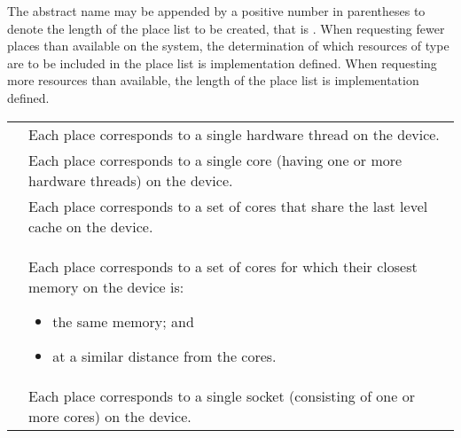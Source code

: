 The abstract name may be appended by a positive number in parentheses
to denote the length of the place list to be created, that is
. When requesting fewer places than
available on the system, the determination of which resources of type
 are to be included in the place list is implementation
defined. When requesting more resources than available, the length of the
place list is implementation defined.

\medskip
\nolinenumbers
\renewcommand{\arraystretch}{1.5}
\tablelasttail{\hline}
\begin{supertabular}{p{1.5in} p{3.5in}}
{} & Each place corresponds to a single hardware
                    thread on the device.\\
{}   & Each place corresponds to a single core (having
                    one or more hardware threads) on the device.\\
{} & Each place corresponds to a set of cores that 
                    share the last level cache on the device.\\
{} & Each place corresponds to a set of cores for
                    which their closest memory on the device is:
		    \begin{itemize}
			    \item the same memory; and
			    \item at a similar distance from the cores.
		    \end{itemize}\\
{} & Each place corresponds to a single socket (consisting
                    of one or more cores) on the device.\\
\end{supertabular}

\linenumbers

